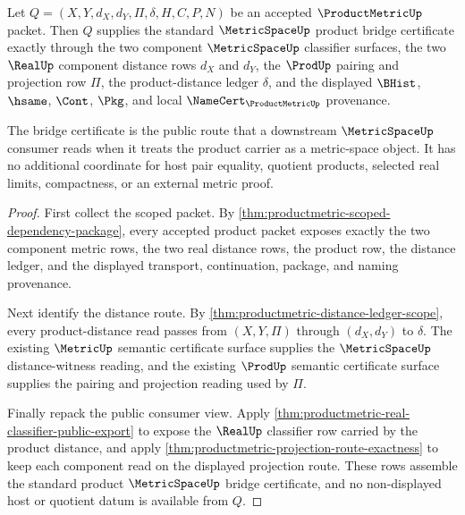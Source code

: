 \begin{theorem}
\label{thm:productmetric-standard-metricspace-bridge-certificate}
Let $Q=(X,Y,d_X,d_Y,\Pi,\delta,H,C,P,N)$ be an accepted $\ProductMetricUp$ packet. Then $Q$ supplies the standard $\MetricSpaceUp$ product bridge certificate exactly through the two component $\MetricSpaceUp$ classifier surfaces, the two $\RealUp$ component distance rows $d_X$ and $d_Y$, the $\ProdUp$ pairing and projection row $\Pi$, the product-distance ledger $\delta$, and the displayed $\BHist$, $\hsame$, $\Cont$, $\Pkg$, and local $\NameCert_{\ProductMetricUp}$ provenance.

The bridge certificate is the public route that a downstream $\MetricSpaceUp$ consumer reads when it treats the product carrier as a metric-space object. It has no additional coordinate for host pair equality, quotient products, selected real limits, compactness, or an external metric proof.
\end{theorem}
\begin{proof}
First collect the scoped packet. By \autoref{thm:productmetric-scoped-dependency-package}, every accepted product packet exposes exactly the two component metric rows, the two real distance rows, the product row, the distance ledger, and the displayed transport, continuation, package, and naming provenance.

Next identify the distance route. By \autoref{thm:productmetric-distance-ledger-scope}, every product-distance read passes from $(X,Y,\Pi)$ through $(d_X,d_Y)$ to $\delta$. The existing $\MetricUp$ semantic certificate surface supplies the $\MetricSpaceUp$ distance-witness reading, and the existing $\ProdUp$ semantic certificate surface supplies the pairing and projection reading used by $\Pi$.

Finally repack the public consumer view. Apply \autoref{thm:productmetric-real-classifier-public-export} to expose the $\RealUp$ classifier row carried by the product distance, and apply \autoref{thm:productmetric-projection-route-exactness} to keep each component read on the displayed projection route. These rows assemble the standard product $\MetricSpaceUp$ bridge certificate, and no non-displayed host or quotient datum is available from $Q$.
\end{proof}

